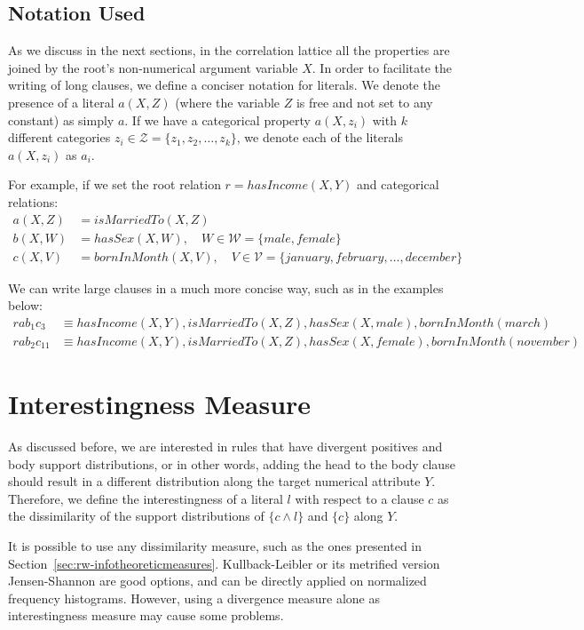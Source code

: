\subsection{Notation Used}
\label{sec:notation}

As we discuss in the next sections, in the correlation lattice all the properties are joined by the root's
non-numerical argument variable $X$. In order to facilitate the writing of long clauses, we define a conciser notation
for literals. We denote the presence of a literal $a(X,Z)$ (where the variable $Z$ is free and not set to any constant)
as simply $a$. If we have a categorical property $a(X,z_i)$ with $k$ different categories $z_i \in \mathcal{Z}=\{
z_1,z_2,\ldots,z_k\}$, we denote each of the literals $a(X,z_i)$ as $a_i$.

For example, if we set the root relation $r=hasIncome(X,Y)$ and categorical relations:
\begin{align*}
a(X,Z)&=isMarriedTo(X,Z) \\
b(X,W)&=hasSex(X,W), \quad W \in \mathcal{W} =\{male,female\} \\
c(X,V)&=bornInMonth(X,V), \quad V \in \mathcal{V} =\{january,february,\ldots,december\}
\end{align*}

We can write large clauses in a much more concise way, such as in the examples below:
\begin{align*}
rab_1c_3 &\equiv hasIncome(X,Y),isMarriedTo(X,Z),hasSex(X,male),bornInMonth(march) \\
rab_2c_{11} &\equiv hasIncome(X,Y),isMarriedTo(X,Z),hasSex(X,female),bornInMonth(november)
\end{align*}

\section{Interestingness Measure}

As discussed before, we are interested in rules that have divergent positives and body support distributions, or in
other words, adding the head to the body clause should result in a different distribution along the target numerical
attribute $Y$. Therefore, we define the interestingness of a literal $l$ with respect to a clause $c$ as the
dissimilarity of the support distributions of $\{c \wedge l\}$ and $\{c\}$ along $Y$.

It is possible to use any dissimilarity measure, such as the ones presented
in Section~\ref{sec:rw-infotheoreticmeasures}. Kullback-Leibler or its metrified version Jensen-Shannon are good
options, and can be directly applied on normalized frequency histograms. However, using a divergence
measure alone as interestingness measure may cause some problems.

